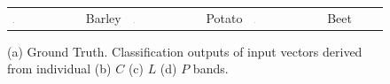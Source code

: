 \begin{figure}[t]
\begin{tabular}{llllllll}
\includegraphics[width=0.01\textwidth]{Figures/Kron/Legend/Barley} & Barley & \includegraphics[width=0.01\textwidth]{Figures/Kron/Legend/Potatoe} & Potato  & \includegraphics[width=0.01\textwidth]{Figures/Kron/Legend/Beet} & Beet &  & 
\end{tabular}
\caption{(a) Ground Truth.  Classification outputs of input vectors derived from individual (b) $C$ (c) $L$ (d) $P$ bands. }\label{fig:SingleBand}
\end{figure}



